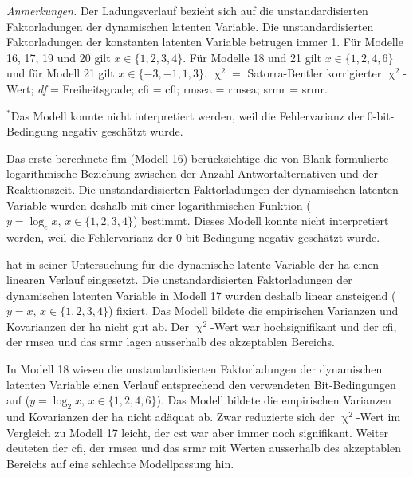 \documentclass[11pt, twoside, a4paper]{book}		%
\begin{document}
\begin{table}[htb]
\begin{adjustbox}{width=1\textwidth, keepaspectratio}
\begin{threeparttable}
{\begin{tabular}
					
				\end{tabular}%
			}
			\begin{tablenotes}[flushleft]
				\footnotesize				%
				\setlength{}	%
				\item \textit{Anmerkungen.} Der Ladungsverlauf bezieht sich auf die unstandardisierten Faktorladungen der dynamischen latenten Variable. Die unstandardisierten Faktorladungen der konstanten latenten Variable betrugen immer 1. Für Modelle 16, 17, 19 und 20 gilt $x\in\{1,2,3,4\}$. Für Modelle 18 und 21 gilt $x\in\{1,2,4,6\}$ und für Modell 21 gilt $x\in\{-3,-1,1,3\}$. $\upchi^2 =$ Satorra-Bentler \citeyearpar{Satorra1994} korrigierter $\upchi^2$-Wert; \textit{df} = Freiheitsgrade; \gls{cfi} = \acrlong{cfi}; \gls{rmsea} = \acrlong{rmsea}; \gls{srmr} = \acrlong{srmr}.
				\item {$^{*}$}Das Modell konnte nicht interpretiert werden, weil die Fehlervarianz der 0-bit-Bedingung negativ geschätzt wurde.
			\end{tablenotes}%
		\end{threeparttable}
	\end{adjustbox}	
\end{table}



Das erste berechnete \gls{flm} (Modell 16) berücksichtige die von Blank \citep[1934; zitiert nach][S. 11]{Hick1952} formulierte logarithmische Beziehung zwischen der Anzahl Antwortalternativen und der Reaktionszeit. Die unstandardisierten Faktorladungen der dynamischen latenten Variable wurden deshalb mit einer logarithmischen Funktion ($y=\log_{e}x,\,x\in\{1, 2, 3, 4\}$) bestimmt. Dieses Modell konnte nicht interpretiert werden, weil die Fehlervarianz der 0-bit-Bedingung negativ geschätzt wurde.

\citet{Schweizer2006a} hat in seiner Untersuchung für die dynamische latente Variable der \gls{ha} einen linearen Verlauf eingesetzt. 
Die unstandardisierten Faktorladungen der dynamischen latenten Variable in Modell 17 wurden deshalb linear ansteigend ($y=x,\,x\in\{1, 2, 3, 4\}$) fixiert. Das Modell bildete die empirischen Varianzen und Kovarianzen der \gls{ha} nicht gut ab. Der $\upchi^2$-Wert war hochsignifikant und der \gls{cfi}, der \gls{rmsea} und das \gls{srmr} lagen ausserhalb des akzeptablen Bereichs.

In Modell 18 wiesen die unstandardisierten Faktorladungen der dynamischen latenten Variable einen Verlauf entsprechend den verwendeten Bit-Bedingungen auf ($y=\log_{2}x,\,x\in\{1, 2, 4, 6\}$). Das Modell bildete die empirischen Varianzen und Kovarianzen der \gls{ha} nicht adäquat ab. Zwar reduzierte sich der $\upchi^2$-Wert im Vergleich zu Modell 17 leicht, der \gls{cst} war aber immer noch signifikant. Weiter deuteten der \gls{cfi}, der \gls{rmsea} und das \gls{srmr} mit Werten ausserhalb des akzeptablen Bereichs auf eine schlechte Modellpassung hin.
\end{document}
